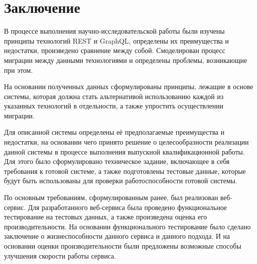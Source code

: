\chapter*{Заключение} \label{ch-conclusion}

В процессе выполнения научно-исследовательской работы были изучены принципы технологий REST и GraphQL, определены их преимущества и недостатки, произведено сравнение между собой.
Смоделирован процесс миграции между данными технологиями и определены проблемы, возникающие при этом.

На основании полученных данных сформулированы принципы, лежащие в основе системы, которая должна стать альтернативой использованию каждой из указанных технологий в отдельности, а также упростить осуществлении миграции.

Для описанной системы определены её предполагаемые преимущества и недостатки, на основании чего принято решение о целесообразности реализации данной системы в процессе выполнения выпускной квалификационной работы.
Для этого было сформулировано техническое задание, включающее в себя требования к готовой системе, а также подготовлены тестовые данные, которые будут быть использованы для проверки работоспособности готовой системы.

По основным требованиям, сформулированным ранее, был реализован веб-сервис.
Для разработанного веб-сервиса была проведено функциональное тестирование на тестовых данных, а также произведена оценка его производительности. %
На основании функционального тестирование было сделано заключение о жизнеспособности данного сервиса и данного подхода.
И на основании оценки производительности были предложены возможные способы улучшения скорости работы сервиса.


